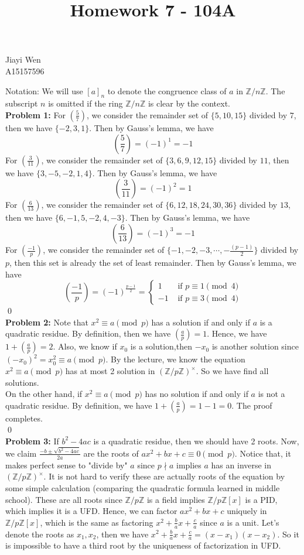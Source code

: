 \documentclass[12pt]{amsart}
\newcommand{\Z}{\mathbb{Z}}
\begin{document}
\title{Homework 7 - 104A}
\maketitle
\begin{center}
    Jiayi Wen\\
    A15157596
\end{center}
Notation: We will use $[a]_n$ to denote the congruence class of $a$ in $\Z/n\Z$. The subscript $n$ is omitted if the ring $\Z/n\Z$ is clear by the context.\\
\textbf{Problem 1:} For $(\frac{5}{7})$, we consider the remainder set of $\{5,10,15\}$ divided by $7$, then we have $\{-2,3,1\}$. Then by Gauss's lemma, we have 
\[(\frac{5}{7})=(-1)^1=-1\]
For $(\frac{3}{11})$, we consider the remainder set of $\{3,6,9,12,15\}$ divided by $11$, then we have $\{3,-5,-2,1,4\}$. Then by Gauss's lemma, we have 
\[(\frac{3}{11})=(-1)^2=1\]
For $(\frac{6}{13})$, we consider the remainder set of $\{6,12,18,24,30,36\}$ divided by $13$, then we have $\{6,-1,5,-2,4,-3\}$. Then by Gauss's lemma, we have 
\[(\frac{6}{13})=(-1)^3=-1\]
For $(\frac{-1}{p})$, we consider the remainder set of $\{-1,-2,-3,\cdots, -\frac{(p-1)}{2}\}$ divided by $p$, then this set is already the set of least remainder. Then by Gauss's lemma, we have 
\[(\frac{-1}{p})=(-1)^{\frac{p-1}{2}}=\begin{cases}
    1 &\text{ if }p\equiv 1\pmod 4\\
    -1 &\text{ if }p\equiv 3\pmod 4
\end{cases}\]
\qed\\
\textbf{Problem 2:} Note that $x^2\equiv a \pmod p$ has a solution if and only if $a$ is a quadratic residue. By definition, then we have $(\frac{a}{p})=1$. Hence, we have $1+(\frac{a}{p})=2$. Also, we know if $x_0$ is a solution,then $-x_0$ is another solution since $(-x_0)^2=x_0^2\equiv a\pmod p$. By the lecture, we know the equation $x^2\equiv a\pmod p$ has at most 2 solution in $(\Z/p\Z)^\times $. So we have find all solutions.\\
On the other hand, if $x^2\equiv a\pmod p$ has no solution if and only if $a$ is not a quadratic residue. By definition, we have $1+(\frac{a}{p})=1-1=0$. The proof completes.
\\\qed\\
\textbf{Problem 3:} If $b^2-4ac$ is a quadratic residue, then we should have 2 roots. Now, we claim $\frac{-b\pm \sqrt{b^2-4ac}}{2a}$ are the roots of $ax^2+bx+c\equiv 0\pmod p$. Notice that, it makes perfect sense to "divide by" $a$ since $p\nmid a$ implies $a$ has an inverse in $(\Z/p\Z)^\times$. It is not hard to verify these are actually roots of the equation by some simple calculation (comparing the quadratic formula learned in middle school). These are all roots since $\Z/p\Z$ is a field implies $\Z/p\Z[x]$ is a PID, which implies it is a UFD. Hence, we can factor $ax^2+bx+c$ uniquely in $\Z/p\Z[x]$, which is the same as factoring $x^2+\frac{b}{a}x+\frac{c}{a}$ since $a$ is a unit. Let's denote the roots as $x_1,x_2$, then we have $x^2+\frac{b}{a}x+\frac{c}{a}=(x-x_1)(x-x_2)$. So it is impossible to have a third root by the uniqueness of factorization in UFD.\\
\end{document}
